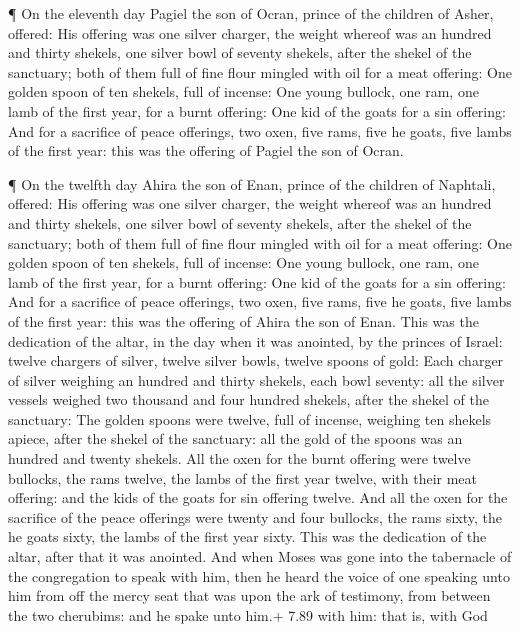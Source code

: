  ¶ On the eleventh day Pagiel the son of Ocran, prince of
the children of Asher, offered:  His offering was one
silver charger, the weight whereof was an hundred and thirty shekels,
one silver bowl of seventy shekels, after the shekel of the sanctuary;
both of them full of fine flour mingled with oil for a meat offering:
 One golden spoon of ten shekels, full of incense:
 One young bullock, one ram, one lamb of the first year,
for a burnt offering:  One kid of the goats for a sin
offering:  And for a sacrifice of peace offerings, two
oxen, five rams, five he goats, five lambs of the first year: this was
the offering of Pagiel the son of Ocran.

 ¶ On the twelfth day Ahira the son of Enan, prince of the
children of Naphtali, offered:  His offering was one silver
charger, the weight whereof was an hundred and thirty shekels, one
silver bowl of seventy shekels, after the shekel of the sanctuary; both
of them full of fine flour mingled with oil for a meat offering:
 One golden spoon of ten shekels, full of incense:
 One young bullock, one ram, one lamb of the first year,
for a burnt offering:  One kid of the goats for a sin
offering:  And for a sacrifice of peace offerings, two
oxen, five rams, five he goats, five lambs of the first year: this was
the offering of Ahira the son of Enan.  This was the
dedication of the altar, in the day when it was anointed, by the princes
of Israel: twelve chargers of silver, twelve silver bowls, twelve spoons
of gold:  Each charger of silver weighing an hundred and
thirty shekels, each bowl seventy: all the silver vessels weighed two
thousand and four hundred shekels, after the shekel of the sanctuary:
 The golden spoons were twelve, full of incense, weighing
ten shekels apiece, after the shekel of the sanctuary: all the gold of
the spoons was an hundred and twenty shekels.  All the oxen
for the burnt offering were twelve bullocks, the rams twelve, the lambs
of the first year twelve, with their meat offering: and the kids of the
goats for sin offering twelve.  And all the oxen for the
sacrifice of the peace offerings were twenty and four bullocks, the rams
sixty, the he goats sixty, the lambs of the first year sixty. This was
the dedication of the altar, after that it was anointed. 
And when Moses was gone into the tabernacle of the congregation to speak
with him, then he heard the voice of one speaking unto him from off the
mercy seat that was upon the ark of testimony, from between the two
cherubims: and he spake unto him.+ 7.89 with him: that is, with God

